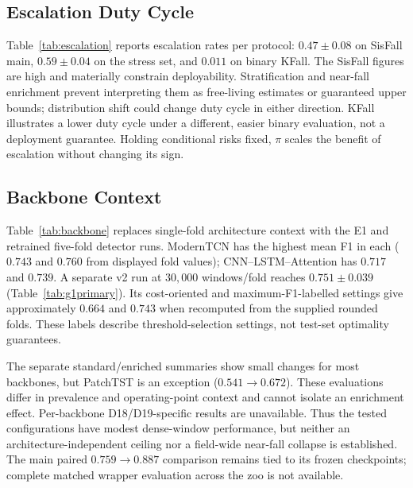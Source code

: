 \documentclass[journal]{IEEEtran}
\begin{document}


\subsection{Escalation Duty Cycle}
Table~\ref{tab:escalation} reports escalation rates per protocol: $0.47{\pm}0.08$ on SisFall main, $0.59{\pm}0.04$ on the stress set, and $0.011$ on binary KFall. The SisFall figures are high and materially constrain deployability. Stratification and near-fall enrichment prevent interpreting them as free-living estimates or guaranteed upper bounds; distribution shift could change duty cycle in either direction. KFall illustrates a lower duty cycle under a different, easier binary evaluation, not a deployment guarantee. Holding conditional risks fixed, $\pi$ scales the benefit of escalation without changing its sign.



\subsection{Backbone Context}
Table~\ref{tab:backbone} replaces single-fold architecture context with the E1 and retrained five-fold detector runs. ModernTCN has the highest mean F1 in each ($0.743$ and $0.760$ from displayed fold values); CNN--LSTM--Attention has $0.717$ and $0.739$. A separate v2 run at $30{,}000$ windows/fold reaches $0.751{\pm}0.039$ (Table~\ref{tab:g1primary}). Its cost-oriented and maximum-F1-labelled settings give approximately $0.664$ and $0.743$ when recomputed from the supplied rounded folds. These labels describe threshold-selection settings, not test-set optimality guarantees.

The separate standard/enriched summaries show small changes for most backbones, but PatchTST is an exception ($0.541{\rightarrow}0.672$). These evaluations differ in prevalence and operating-point context and cannot isolate an enrichment effect. Per-backbone D18/D19-specific results are unavailable. Thus the tested configurations have modest dense-window performance, but neither an architecture-independent ceiling nor a field-wide near-fall collapse is established. The main paired $0.759{\rightarrow}0.887$ comparison remains tied to its frozen checkpoints; complete matched wrapper evaluation across the zoo is not available.



\end{document}
